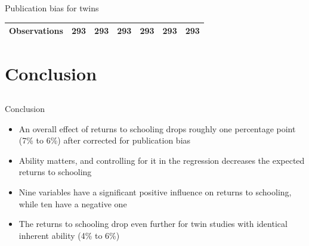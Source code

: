 \documentclass{beamer} %
\begin{document}
\begin{frame}{Publication bias for twins}
\begin{tiny}
\begin{table}[!htbp]
\begin{tabular}{
                    @{}
                    l*{6}{c}}
                \midrule
                \addlinespace[0.5em]
                Observations                          & 293     & 293     & 293     & 293     & 293     & 293     \\

                \bottomrule
            \end{tabular}
        \end{table}

    \end{tiny}
\end{frame}


\section{Conclusion}
\subsection{}


\begin{frame}{Conclusion}
    \begin{itemize}
        \item An overall effect of returns to schooling drops roughly one percentage point (7\% to 6\%) after corrected for publication bias
        \item Ability matters, and controlling for it in the regression decreases the expected returns to schooling
        \item Nine variables have a significant positive influence on returns to schooling, while ten have a negative one
        \item The returns to schooling drop even further for twin studies with identical inherent ability (4\% to 6\%)
    \end{itemize}
\end{frame}



\end{document}
